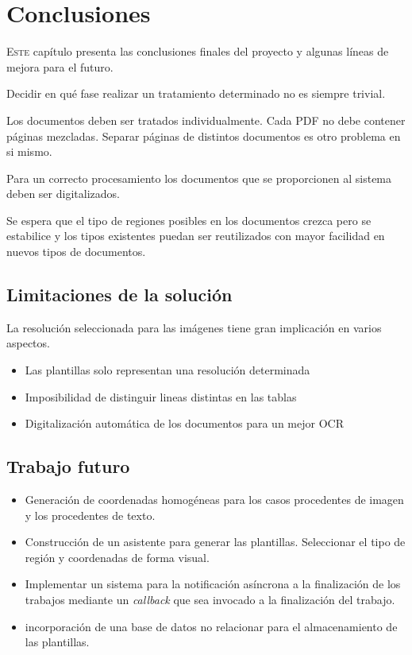 
\chapter{Conclusiones}
\label{chap:conclusiones}

\lettrine{E}{ste} capítulo presenta las conclusiones finales del proyecto y algunas líneas de mejora para el futuro.

Decidir en qué fase realizar un tratamiento determinado no es siempre trivial.

Los documentos deben ser tratados individualmente. Cada PDF no debe contener páginas mezcladas. Separar páginas de distintos documentos es otro problema en si mismo.

Para un correcto procesamiento los documentos que se proporcionen 
al sistema deben ser digitalizados.

Se espera que el tipo de regiones posibles en los documentos crezca pero se estabilice y los tipos existentes puedan ser reutilizados con mayor facilidad en nuevos tipos de documentos.

\section{Limitaciones de la solución}
La resolución seleccionada para las imágenes tiene gran implicación en varios aspectos.
\begin{itemize}
    \item Las plantillas solo representan una resolución determinada
    \item Imposibilidad de distinguir lineas distintas en las tablas
    \item Digitalización automática de los documentos para un mejor OCR
\end{itemize}

\section{Trabajo futuro}

\begin{itemize}
    \item Generación de coordenadas homogéneas para los casos procedentes de imagen y los procedentes de texto.
    \item Construcción de un asistente para generar las plantillas. Seleccionar el tipo de región y coordenadas de forma visual.
    \item Implementar un sistema para la notificación asíncrona a la finalización de los trabajos mediante un \emph{callback} que sea invocado a la finalización del trabajo.
    \item incorporación de una base de datos no relacionar para el almacenamiento de las plantillas.
\end{itemize}


